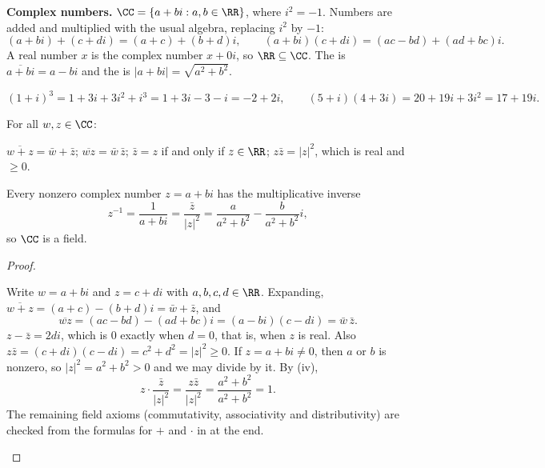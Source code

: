 \documentclass[10pt]{scrartcl}
\begin{document}
\textbf{Complex numbers.} $\CC=\{a+bi:a,b\in\RR\}$, where $i^2=-1$. Numbers are added and multiplied with the usual algebra, replacing $i^2$ by $-1$:
\[
  (a+bi)+(c+di)=(a+c)+(b+d)i,\qquad (a+bi)(c+di)=(ac-bd)+(ad+bc)i.
\]
A real number $x$ is the complex number $x+0i$, so $\RR\subseteq\CC$. The  is $\overline{a+bi}=a-bi$ and the  is $|a+bi|=\sqrt{a^2+b^2}$.

\begin{example*}
  \[
    (1+i)^3=1+3i+3i^2+i^3=1+3i-3-i=-2+2i,\qquad (5+i)(4+3i)=20+19i+3i^2=17+19i.
  \]
\end{example*}

\begin{proposition*}
  For all $w,z\in\CC$:
  \begin{enumerate}[(i)]
    \ii $\overline{w+z}=\bar w+\bar z$;
    \ii $\overline{wz}=\bar w\,\bar z$;
    \ii $\bar z=z$ if and only if $z\in\RR$;
    \ii $z\bar z=|z|^2$, which is real and $\ge 0$.
  \end{enumerate}
  Every nonzero complex number $z=a+bi$ has the multiplicative inverse
  \[
    z^{-1} = \frac{1}{a+bi} = \frac{\bar z}{|z|^2} = \frac{a}{a^2+b^2} - \frac{b}{a^2+b^2}i,
  \]
  so $\CC$ is a field.
\end{proposition*}
\begin{proof}
  \begin{steps}
    \ii Write $w=a+bi$ and $z=c+di$ with $a,b,c,d\in\RR$. Expanding, $\overline{w+z}=(a+c)-(b+d)i=\bar w+\bar z$, and
    \[
      \overline{wz}=(ac-bd)-(ad+bc)i=(a-bi)(c-di)=\bar w\,\bar z.
    \]
    \ii $z-\bar z=2di$, which is $0$ exactly when $d=0$, that is, when $z$ is real. Also $z\bar z=(c+di)(c-di)=c^2+d^2=|z|^2\ge 0$.
    \ii If $z=a+bi\ne 0$, then $a$ or $b$ is nonzero, so $|z|^2=a^2+b^2>0$ and we may divide by it. By (iv),
    \[
      z\cdot\frac{\bar z}{|z|^2}=\frac{z\bar z}{|z|^2}=\frac{a^2+b^2}{a^2+b^2}=1.
    \]
    The remaining field axioms (commutativity, associativity and distributivity) are checked from the formulas for $+$ and $\cdot$ in  at the end.
  \end{steps}
\end{proof}
\end{document}
